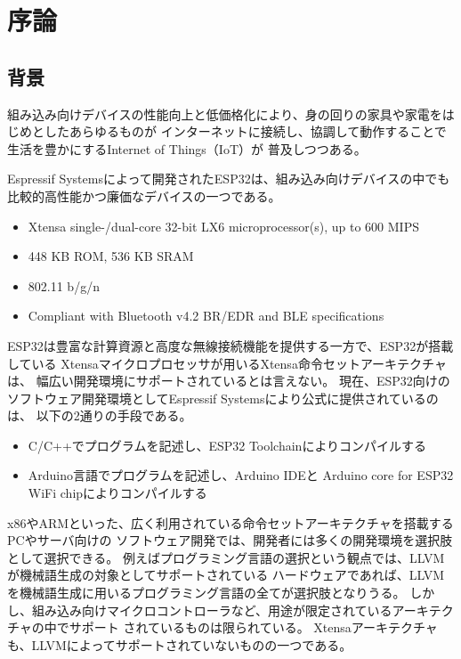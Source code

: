 \chapter{序論}
\label{chap:introduction}

\section{背景}
\label{section:background}

組み込み向けデバイスの性能向上と低価格化により、身の回りの家具や家電をはじめとしたあらゆるものが
インターネットに接続し、協調して動作することで生活を豊かにするInternet of Things（IoT）が
普及しつつある。

Espressif Systemsによって開発されたESP32\cite{esp32}は、組み込み向けデバイスの中でも
比較的高性能かつ廉価なデバイスの一つである。

\begin{itemize}
  \item Xtensa single-/dual-core 32-bit LX6 microprocessor(s), up to 600 MIPS
  \item 448 KB ROM, 536 KB SRAM
  \item 802.11 b/g/n
  \item Compliant with Bluetooth v4.2 BR/EDR and BLE specifications
\end{itemize}

ESP32は豊富な計算資源と高度な無線接続機能を提供する一方で、ESP32が搭載している
Xtensaマイクロプロセッサが用いるXtensa命令セットアーキテクチャ\cite{xtensa_isa}は、
幅広い開発環境にサポートされているとは言えない。
現在、ESP32向けのソフトウェア開発環境としてEspressif Systemsにより公式に提供されているのは、
以下の2通りの手段である\cite{esp_toolchain}。

\begin{itemize}
  \item C/C++でプログラムを記述し、ESP32 Toolchainによりコンパイルする
  \item Arduino言語でプログラムを記述し、Arduino IDEと
        Arduino core for ESP32 WiFi chipによりコンパイルする
\end{itemize}

x86やARMといった、広く利用されている命令セットアーキテクチャを搭載するPCやサーバ向けの
ソフトウェア開発では、開発者には多くの開発環境を選択肢として選択できる。
例えばプログラミング言語の選択という観点では、LLVMが機械語生成の対象としてサポートされている
ハードウェアであれば、LLVMを機械語生成に用いるプログラミング言語の全てが選択肢となりうる。
しかし、組み込み向けマイクロコントローラなど、用途が限定されているアーキテクチャの中でサポート
されているものは限られている\cite{llvm_matrix}。
Xtensaアーキテクチャも、LLVMによってサポートされていないものの一つである。

